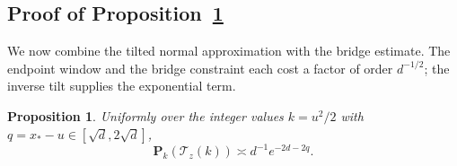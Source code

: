 \documentclass[11pt,letterpaper,reqno]{amsart}
\numberwithin{equation}{section}
\newtheorem{proposition}[theorem]{Proposition}
\theoremstyle{remark}
\begin{document}
\subsection{Proof of Proposition~\ref{prop:terminalprob}}\label{sec:onepoint}\label{sec:terminalprob}
We now combine the tilted normal approximation with the bridge estimate. The endpoint window and the bridge constraint each cost a factor of order $d^{-1/2}$; the inverse tilt supplies the exponential term.
\begin{proposition}\label{prop:terminalprob}
Uniformly over the integer values $k=u^2/2$ with $q=x_*-u\in[\sqrt d,2\sqrt d]$,
\begin{equation}\label{eq:7.18}
\mathbf P_k(\mathcal T_z(k))\asymp d^{-1}e^{-2d-2q}.
\end{equation}
\end{proposition}
\end{document}
